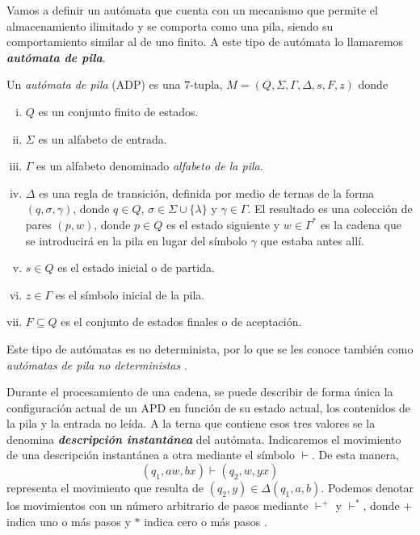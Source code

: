 \vspace{10pt}
Vamos a definir un autómata que cuenta con un mecanismo que permite el almacenamiento ilimitado y se comporta como una
pila, siendo su comportamiento similar al de uno finito. A este tipo de autómata lo llamaremos 
\textbf{\textit{autómata de pila}}.

\begin{definicion} Un \textit{autómata de pila} (ADP) es una $7$-tupla, 
$M=(Q,\Sigma,\Gamma,\Delta,s,F,z)$ donde
\begin{enumerate}[(i)]
    \item $Q$ es un conjunto finito de estados.
    \item $\Sigma$ es un alfabeto de entrada.
    \item $\Gamma$ es un alfabeto denominado \textit{alfabeto de la pila}.
    \item $\Delta$ es una regla de transición, definida por medio de ternas de la forma $(q,\sigma,\gamma)$, donde 
    $q\in Q$, $\sigma\in\Sigma\cup\{\lambda\}$ y $\gamma\in\Gamma$. El resultado es una colección de pares $(p,w)$, 
    donde $p\in Q$ es el estado siguiente y $w\in\Gamma^*$ es la cadena que se introducirá en la pila en lugar del 
    símbolo $\gamma$ que estaba antes allí.
    \item $s\in Q$ es el estado inicial o de partida.
    \item $z\in\Gamma$ es el símbolo inicial de la pila.
    \item $F\subseteq Q$ es el conjunto de estados finales o de aceptación.
\end{enumerate}
Este tipo de autómatas es no determinista, por lo que se les conoce también como 
\textit{autómatas de pila no deterministas} \cite{kelley_2001}.
\end{definicion}

Durante el procesamiento de una cadena, se puede describir de forma única la configuración actual de un APD en función
de su estado actual, los contenidos de la pila y la entrada no leída. A la terna que contiene esos tres valores se la
denomina \textbf{\textit{descripción instantánea}} del autómata. Indicaremos el movimiento de una descripción 
instantánea a otra mediante el símbolo $\vdash$. De esta manera,
\begin{equation}
    (q_1,aw,bx)\vdash(q_2,w,yx)
\end{equation}
representa el movimiento que resulta de $(q_2,y)\in\Delta(q_1,a,b)$. Podemos denotar los movimientos con un número
arbitrario de pasos mediante $\vdash^+$ y $\vdash^*$, donde $+$ indica uno o más pasos y $*$ indica cero o más pasos
\cite{kelley_2001}.

